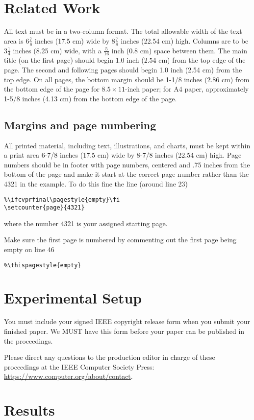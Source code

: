\documentclass[10pt,twocolumn,letterpaper]{article}
\begin{document}
\section{Related Work}

All text must be in a two-column format. The total allowable width of the
text area is $6\frac78$ inches (17.5 cm) wide by $8\frac78$ inches (22.54
cm) high. Columns are to be $3\frac14$ inches (8.25 cm) wide, with a
$\frac{5}{16}$ inch (0.8 cm) space between them. The main title (on the
first page) should begin 1.0 inch (2.54 cm) from the top edge of the
page. The second and following pages should begin 1.0 inch (2.54 cm) from
the top edge. On all pages, the bottom margin should be 1-1/8 inches (2.86
cm) from the bottom edge of the page for $8.5 \times 11$-inch paper; for A4
paper, approximately 1-5/8 inches (4.13 cm) from the bottom edge of the
page.

\subsection{Margins and page numbering}

All printed material, including text, illustrations, and charts, must be kept
within a print area 6-7/8 inches (17.5 cm) wide by 8-7/8 inches (22.54 cm)
high.
Page numbers should be in footer with page numbers, centered and .75
inches from the bottom of the page and make it start at the correct page
number rather than the 4321 in the example.  To do this fine the line (around
line 23)
\begin{verbatim}
%\ifcvprfinal\pagestyle{empty}\fi
\setcounter{page}{4321}
\end{verbatim}
where the number 4321 is your assigned starting page.

Make sure the first page is numbered by commenting out the first page being
empty on line 46
\begin{verbatim}
%\thispagestyle{empty}
\end{verbatim}


\section{Experimental Setup}

You must include your signed IEEE copyright release form when you submit
your finished paper. We MUST have this form before your paper can be
published in the proceedings.

Please direct any questions to the production editor in charge of these 
proceedings at the IEEE Computer Society Press: 
\url{https://www.computer.org/about/contact}. 


\section{Results}


{\small


}
\end{document}
